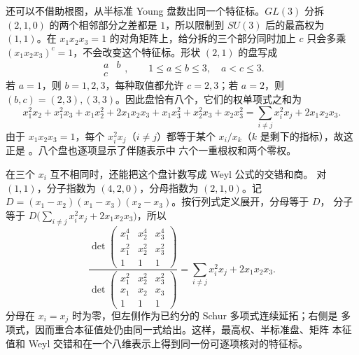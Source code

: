 \begin{samepage}
还可以不借助根图，从半标准 Young 盘数出同一个特征标。$GL(3)$ 分拆
$(2,1,0)$ 的两个相邻部分之差都是 $1$，所以限制到 $SU(3)$ 后的最高权为
$(1,1)$。在 $x_1x_2x_3=1$ 的对角矩阵上，给分拆的三个部分同时加上
$c$ 只会多乘 $(x_1x_2x_3)^c=1$，不会改变这个特征标。形状 $(2,1)$ 的盘写成
\[
\begin{array}{cc}a&b\\c&\end{array},
\qquad 1\le a\le b\le3,\quad a<c\le3.
\]
若 $a=1$，则 $b=1,2,3$，每种取值都允许 $c=2,3$；若 $a=2$，则
$(b,c)=(2,3),(3,3)$。因此盘恰有八个，它们的权单项式之和为
\[
x_1^2x_2+x_1^2x_3+x_1x_2^2+2x_1x_2x_3
+x_1x_3^2+x_2^2x_3+x_2x_3^2
=\sum_{i\ne j}x_i^2x_j+2x_1x_2x_3.
\]
由于 $x_1x_2x_3=1$，每个 $x_i^2x_j$（$i\ne j$）都等于某个
$x_i/x_k$（$k$ 是剩下的指标），故这正是
。八个盘也逐项显示了伴随表示中
六个一重根权和两个零权。
\end{samepage}

在三个 $x_i$ 互不相同时，还能把这个盘计数写成 Weyl 公式的交错和商。
对 $(1,1)$，分子指数为 $(4,2,0)$，分母指数为 $(2,1,0)$。记
$D=(x_1-x_2)(x_1-x_3)(x_2-x_3)$。按行列式定义展开，分母等于 $D$，
分子等于 $D\bigl(\sum_{i\ne j}x_i^2x_j+2x_1x_2x_3\bigr)$，所以
\[
\frac{\det\!\begin{pmatrix}
x_1^4&x_2^4&x_3^4\\
x_1^2&x_2^2&x_3^2\\
1&1&1
\end{pmatrix}}
{\det\!\begin{pmatrix}
x_1^2&x_2^2&x_3^2\\
x_1&x_2&x_3\\
1&1&1
\end{pmatrix}}
=\sum_{i\ne j}x_i^2x_j+2x_1x_2x_3.
\]
分母在 $x_i=x_j$ 时为零，但左侧作为已约分的 Schur 多项式连续延拓；右侧是
多项式，因而重合本征值处仍由同一式给出。这样，最高权、半标准盘、矩阵
本征值和 Weyl 交错和在一个八维表示上得到同一份可逐项核对的特征标。

